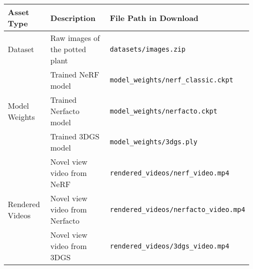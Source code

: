 \documentclass[11pt]{article}
\begin{document}
\begin{center}
\begin{tabular}{l l l}
\hline
\textbf{Asset Type} & \textbf{Description} & \textbf{File Path in Download} \\
\hline
\hline
Dataset & Raw images of the potted plant & \texttt{datasets/images.zip} \\
\hline
\multirow{3}{*}{Model Weights} & Trained NeRF model & \texttt{model\_weights/nerf\_classic.ckpt} \\
& Trained Nerfacto model & \texttt{model\_weights/nerfacto.ckpt} \\
& Trained 3DGS model & \texttt{model\_weights/3dgs.ply} \\
\hline
\multirow{3}{*}{Rendered Videos} & Novel view video from NeRF & \texttt{rendered\_videos/nerf\_video.mp4} \\
& Novel view video from Nerfacto & \texttt{rendered\_videos/nerfacto\_video.mp4} \\
& Novel view video from 3DGS & \texttt{rendered\_videos/3dgs\_video.mp4} \\
\hline
\end{tabular}
\end{center}
\end{document}
